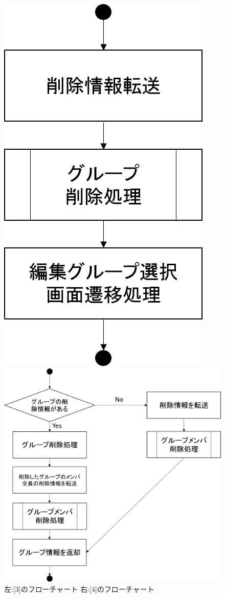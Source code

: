 \begin{figure}[htbp]
 \begin{minipage}{0.5\hsize}
  \begin{center}
   \includegraphics[width=0.45\linewidth,clip]{./img/edit_group/sub3.png}
  \end{center}
 \end{minipage}
 \begin{minipage}{0.5\hsize}
  \begin{center}
   \includegraphics[width=1.2\linewidth,clip]{./img/edit_group/sub4.png}
  \end{center}
 \end{minipage}
 \caption{左:[3]のフローチャート 右:[4]のフローチャート}\label{fig:editgroupflow0}
\end{figure}

